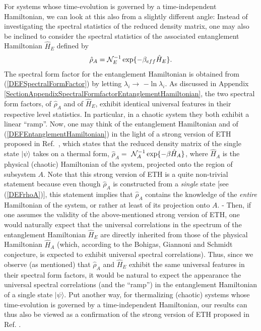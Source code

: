\documentclass[aps,prb,preprint,onecolumn,amsmath,amssymb,superscriptaddress,eqsecnum,floatfix,scrartcl]{revtex4-1}
\begin{document}
For systems whose time-evolution is governed by a time-independent Hamiltonian,
we can look at this also from a  slightly different angle:
Instead of investigating the spectral statistics of the reduced density matrix, one may also  be inclined  to consider the spectral statistics of the
associated  entanglement Hamiltonian
${\hat H}_E$ defined  by
\begin{eqnarray}
\label{DEFEntanglementHamiltonian}
{\hat \rho}_A = {\cal N}_E^{-1} \exp\{- \beta_{eff} {\hat H}_E\}.
\end{eqnarray}
The spectral form factor for the entanglement Hamiltonian
is obtained
 from (\ref{DEFSpectralFormFactor}) by letting $\lambda_i \to$ $- \ln \lambda_i$.
As discussed
in Appendix \ref{SectionAppendixSpectralFormfactorEntanglementHamiltonian},
 the two spectral form factors,  of ${\hat \rho_A}$ and of ${\hat H}_E$, exhibit identical 
universal features in their respective   level statistics. In particular,  in a chaotic system
they 
 both exhibit  a linear ``ramp''.
Now, one may think
of the entanglement Hamiltonian 
and of (\ref{DEFEntanglementHamiltonian}) 
in the light of a strong version of ETH proposed in 
Ref.\ , which states that the reduced density matrix of the single  state $|\psi\rangle$ takes on a thermal form, ${\hat \rho}_A =$
${\cal N}_A^{-1}  \exp\{ - \beta {\hat H}_A \}$,
 where ${\hat H}_A$ is  the physical (chaotic)  Hamiltonian of the system, projected onto the region of subsystem $A$.
Note that this strong version of ETH\cite{Garrison2015} is  a quite non-trivial statement  because even though ${\hat  \rho}_A$ is constructed from a
{\it  single}
 state [see (\ref{DEFrhoA})], 
this statement implies that ${\hat  \rho}_A$ contains the
knowledge of the {\it entire}  Hamiltonian of the system, or rather  at least of its projection onto $A$. -  Then, 
if one assumes the validity of the above-mentioned
strong version of ETH, one would naturally expect that 
the universal correlations in the spectrum of the  entanglement Hamiltonian ${\hat H}_E$ 
are  directly inherited from those  of the physical Hamiltonian ${\hat H}_A$ (which, 
according 
to the 
Bohigas, Giannoni and Schmidt conjecture, is expected to  exhibit universal spectral correlations).
Thus,
since we observe (as mentioned) that 
${\hat \rho}_A$ and ${\hat H}_E$ exhibit the same universal  features in their spectral form factors, 
it would be natural to expect the appearance
the universal spectral correlations (and the ``ramp'') 
in the entanglement Hamiltonian of a single state $|\psi\rangle$. Put another way, for thermalizing (chaotic)  systems whose time-evolution is
governed by a time-independent Hamiltonian,  our results can thus also be viewed
as a confirmation of  the strong version of ETH proposed in Ref. .
\end{document}
